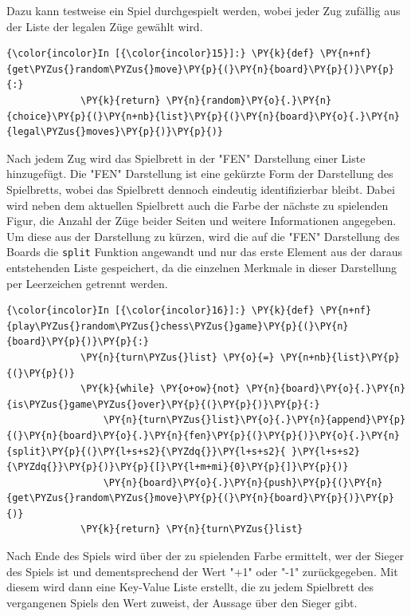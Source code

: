     Dazu kann testweise ein Spiel durchgespielt werden, wobei jeder Zug
zufällig aus der Liste der legalen Züge gewählt wird.

    \begin{Verbatim}[commandchars=\\\{\}]
{\color{incolor}In [{\color{incolor}15}]:} \PY{k}{def} \PY{n+nf}{get\PYZus{}random\PYZus{}move}\PY{p}{(}\PY{n}{board}\PY{p}{)}\PY{p}{:}
             \PY{k}{return} \PY{n}{random}\PY{o}{.}\PY{n}{choice}\PY{p}{(}\PY{n+nb}{list}\PY{p}{(}\PY{n}{board}\PY{o}{.}\PY{n}{legal\PYZus{}moves}\PY{p}{)}\PY{p}{)}
\end{Verbatim}


    Nach jedem Zug wird das Spielbrett in der "FEN" Darstellung einer Liste
hinzugefügt. Die "FEN" Darstellung ist eine gekürzte Form der
Darstellung des Spielbretts, wobei das Spielbrett dennoch eindeutig
identifizierbar bleibt. Dabei wird neben dem aktuellen Spielbrett auch
die Farbe der nächste zu spielenden Figur, die Anzahl der Züge beider
Seiten und weitere Informationen angegeben. Um diese aus der Darstellung
zu kürzen, wird die auf die "FEN" Darstellung des Boards die
\texttt{split} Funktion angewandt und nur das erste Element aus der
daraus entstehenden Liste gespeichert, da die einzelnen Merkmale in
dieser Darstellung per Leerzeichen getrennt werden.

    \begin{Verbatim}[commandchars=\\\{\}]
{\color{incolor}In [{\color{incolor}16}]:} \PY{k}{def} \PY{n+nf}{play\PYZus{}random\PYZus{}chess\PYZus{}game}\PY{p}{(}\PY{n}{board}\PY{p}{)}\PY{p}{:}
             \PY{n}{turn\PYZus{}list} \PY{o}{=} \PY{n+nb}{list}\PY{p}{(}\PY{p}{)}
             \PY{k}{while} \PY{o+ow}{not} \PY{n}{board}\PY{o}{.}\PY{n}{is\PYZus{}game\PYZus{}over}\PY{p}{(}\PY{p}{)}\PY{p}{:}
                 \PY{n}{turn\PYZus{}list}\PY{o}{.}\PY{n}{append}\PY{p}{(}\PY{n}{board}\PY{o}{.}\PY{n}{fen}\PY{p}{(}\PY{p}{)}\PY{o}{.}\PY{n}{split}\PY{p}{(}\PY{l+s+s2}{\PYZdq{}}\PY{l+s+s2}{ }\PY{l+s+s2}{\PYZdq{}}\PY{p}{)}\PY{p}{[}\PY{l+m+mi}{0}\PY{p}{]}\PY{p}{)}
                 \PY{n}{board}\PY{o}{.}\PY{n}{push}\PY{p}{(}\PY{n}{get\PYZus{}random\PYZus{}move}\PY{p}{(}\PY{n}{board}\PY{p}{)}\PY{p}{)}
             \PY{k}{return} \PY{n}{turn\PYZus{}list}
\end{Verbatim}


    Nach Ende des Spiels wird über der zu spielenden Farbe ermittelt, wer
der Sieger des Spiels ist und dementsprechend der Wert "+1" oder "-1"
zurückgegeben. Mit diesem wird dann eine Key-Value Liste erstellt, die
zu jedem Spielbrett des vergangenen Spiels den Wert zuweist, der Aussage
über den Sieger gibt.

